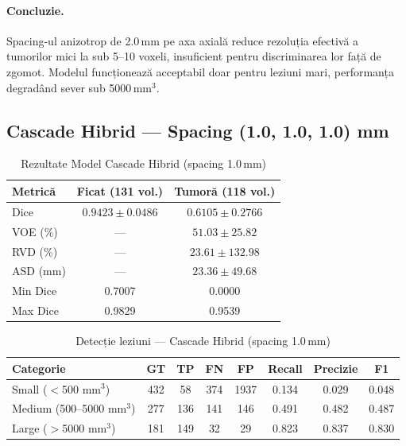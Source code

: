 \documentclass[12pt, a4paper]{report}
\begin{document}
\paragraph{Concluzie.}
Spacing-ul anizotrop de 2.0\,mm pe axa axială reduce rezoluția efectivă a tumorilor mici la sub 5–10 voxeli, insuficient pentru discriminarea lor față de zgomot. Modelul funcționează acceptabil doar pentru leziuni mari, performanța degradând sever sub 5000\,mm$^3$.  
    
    
\subsection{Cascade Hibrid — Spacing (1.0, 1.0, 1.0) mm}

\begin{table}[H]
\centering
\caption{Rezultate Model Cascade Hibrid (spacing 1.0\,mm)}
\label{tab:cascade10_seg}
\begin{tabular}{lcc}
\hline
\textbf{Metrică} & \textbf{Ficat (131 vol.)} & \textbf{Tumoră (118 vol.)} \\
\hline
Dice & $0.9423 \pm 0.0486$ & $0.6105 \pm 0.2766$ \\
VOE (\%) & --- & $51.03 \pm 25.82$ \\
RVD (\%) & --- & $23.61 \pm 132.98$ \\
ASD (mm) & --- & $23.36 \pm 49.68$ \\
Min Dice & 0.7007 & 0.0000 \\
Max Dice & 0.9829 & 0.9539 \\
\hline
\end{tabular}
\end{table}


\begin{table}[H]
\centering
\caption{Detecție leziuni — Cascade Hibrid (spacing 1.0\,mm)}
\label{tab:cascade10_det}
\begin{tabular}{lccccccc}
\hline
\textbf{Categorie} & \textbf{GT} & \textbf{TP} & \textbf{FN} & \textbf{FP} & \textbf{Recall} & \textbf{Precizie} & \textbf{F1} \\
\hline
Small ($<$500 mm$^3$)      & 432 &  58 & 374 & 1937 & 0.134 & 0.029 & 0.048 \\
Medium (500--5000 mm$^3$)  & 277 & 136 & 141 &  146 & 0.491 & 0.482 & 0.487 \\
Large ($>$5000 mm$^3$)     & 181 & 149 &  32 &   29 & 0.823 & 0.837 & 0.830 \\
\hline
\end{tabular}
\end{table}
\end{document}
